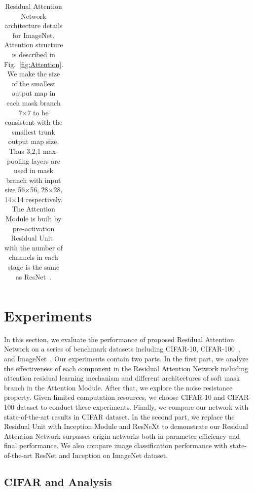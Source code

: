 \documentclass[10pt,twocolumn,letterpaper]{article}
\begin{document}
\begin{table}
\begin{center}
\begin{tabular}{c|c|c|c}
\end{tabular}
\end{center}
\caption{Residual Attention Network architecture details for ImageNet. Attention structure is described in Fig.~\ref{fig:Attention}.  We make the size of the smallest output map in each mask branch 7$\times$7 to be consistent with the smallest trunk output map size. Thus 3,2,1 max-pooling layers are used in mask branch with input size 56$\times$56, 28$\times$28, 14$\times$14 respectively.
%
The Attention Module is built by pre-activation Residual Unit~\cite{he2016identity} with the number of channels in each stage is the same as ResNet~\cite{resnet2016}.
%
}
\label{tab:attention_structure}
\end{table}


\section{Experiments}
In this section, we evaluate the performance of proposed Residual Attention Network on a series of benchmark datasets including CIFAR-10, CIFAR-100~\cite{krizhevsky2009learning}, and ImageNet~\cite{deng2009imagenet}.
%
Our experiments contain two parts. In the first part, we analyze the effectiveness of each component in the Residual Attention Network including attention residual learning mechanism and different architectures of soft mask branch in the Attention Module.
%
After that, we explore the noise resistance property. Given limited computation resources, we choose CIFAR-10 and CIFAR-100 dataset to conduct these experiments. Finally, we compare our network with state-of-the-art results in CIFAR dataset.
%
In the second part, we replace the Residual Unit with Inception Module and ResNeXt to demonstrate our Residual Attention Network surpasses origin networks both in parameter efficiency and final performance.
%
We also compare image classification performance with state-of-the-art ResNet and Inception on ImageNet dataset.
%


\subsection{CIFAR and Analysis}
\end{document}
